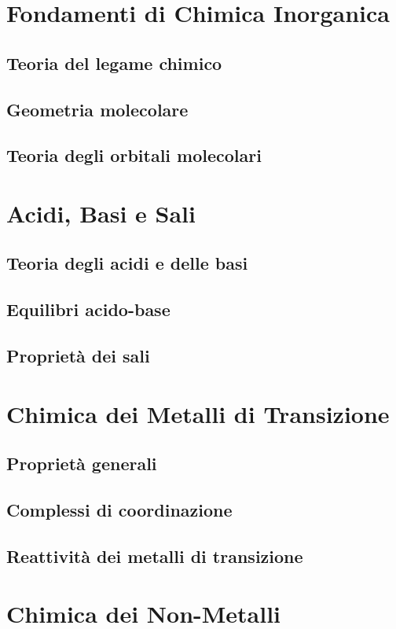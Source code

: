 \section{Fondamenti di Chimica Inorganica}
\subsection{Teoria del legame chimico}
\subsection{Geometria molecolare}
\subsection{Teoria degli orbitali molecolari}

\section{Acidi, Basi e Sali}
\subsection{Teoria degli acidi e delle basi}
\subsection{Equilibri acido-base}
\subsection{Proprietà dei sali}

\section{Chimica dei Metalli di Transizione}
\subsection{Proprietà generali}
\subsection{Complessi di coordinazione}
\subsection{Reattività dei metalli di transizione}

\section{Chimica dei Non-Metalli}
